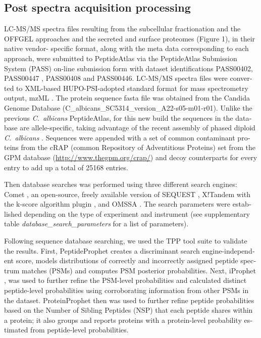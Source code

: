 \begin{otherlanguage}{british}
\subsection*{Post spectra acquisition processing}

LC-MS/MS spectra files resulting from the subcellular fractionation and the OFFGEL
approaches and the secreted and surface proteomes (Figure 1), in their native vendor-
specific format, along with the meta data corresponding to each approach, were submitted to
PeptideAtlas via the PeptideAtlas Submission System (PASS) on-line submission form with
dataset identifications PASS00402, PASS00447 , PASS00408 and PASS00446. LC-MS/MS
spectra files were converted to XML-based HUPO-PSI-adopted standard format for mass
spectrometry output, mzML \citep{Martens2011}. The protein sequence fasta file was obtained from the
Candida Genome Database  (C\_albicans\_SC5314\_version\_A22-s05-m01-r01). Unlike the
previous \textit{\mbox{C. albicans}} PeptideAtlas, for this new build the sequences in the database are
allele-specific, taking advantage of the recent assembly of phased diploid \textit{\mbox{C. albicans}} \citep{Muzzey2013}.
Sequences were appended with a set of common contaminant proteins from the cRAP
(common Repository of Adventitious Proteins) set from the GPM database 
(\href{http://www.thegpm.org/crap/}{http://www.thegpm.org/crap/}) 
and decoy counterparts for every entry to add up a total of 25168 entries.

Then database searches was performed using three different search engines: Comet \citep{Eng2013},
an open-source, freely available version of SEQUEST \citep{Eng1994}, X!Tandem \citep{Craig2004} with the k-score
algorithm plugin \citep{MacLean2006}, and OMSSA \citep{Geer2004}. The search parameters were established depending
on the type of experiment and instrument (see supplementary table \textit{database\_search\_parameters} for a list of parameters).

Following sequence database searching, we used the TPP tool suite to validate the results.
First, PeptideProphet \citep{Keller2002} creates a discriminant search engine-independent score, models
distributions of correctly and incorrectly assigned peptide spectrum matches (PSMs) and
computes PSM posterior probabilities. Next, iProphet \citep{Shteynberg2011}, was used to further refine the
PSM-level probabilities and calculated distinct peptide-level probabilities using corroborating
information from other PSMs in the dataset. ProteinProphet \citep{Nesvizhskii2003} then was used to further
refine peptide probabilities based on the Number of Sibling Peptides (NSP) that each peptide
shares within a protein; it also groups and reports proteins with a protein-level probability
estimated from peptide-level probabilities.


\end{otherlanguage}
